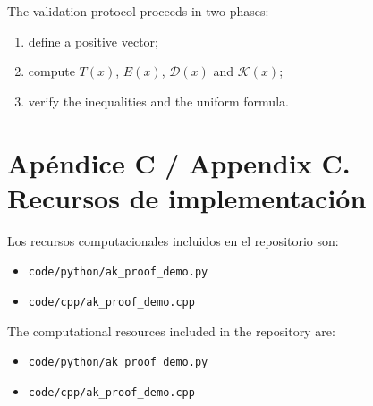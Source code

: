 \documentclass[11pt]{article}
\begin{document}
The validation protocol proceeds in two phases:
\begin{enumerate}[label=\arabic*.]
\item define a positive vector;
\item compute $T(x)$, $E(x)$, $\mathcal{D}(x)$ and $\mathcal{K}(x)$;
\item verify the inequalities and the uniform formula.
\end{enumerate}

\section{Ap\'endice C / Appendix C. Recursos de implementaci\'on}
Los recursos computacionales incluidos en el repositorio son:
\begin{itemize}
\item \texttt{code/python/ak\_proof\_demo.py}
\item \texttt{code/cpp/ak\_proof\_demo.cpp}
\end{itemize}

The computational resources included in the repository are:
\begin{itemize}
\item \texttt{code/python/ak\_proof\_demo.py}
\item \texttt{code/cpp/ak\_proof\_demo.cpp}
\end{itemize}



\end{document}
